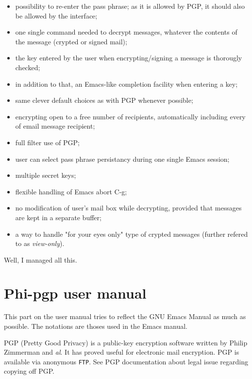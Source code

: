 \begin{itemize}
 \item  possibility to re-enter  the pass phrase;  as it is allowed by
PGP, it should also be allowed by the interface;

 \item one  single command  needed  to decrypt  messages, whatever the
contents of the message (crypted or signed mail);

 \item the key entered by  the user when encrypting/signing a  message
is thorougly checked;

\item in addition  to that, an Emacs-like completion facility when entering a
key;

 \item same clever default choices as with PGP whenever possible;

 \item encrypting  open to a  free number of recipients, automatically
including every of email message recipient;

\item full filter use of PGP;

 \item user can select pass phrase persistancy during one single Emacs
session;

\item multiple secret keys;

\item flexible handling of Emacs abort C-g;

 \item no modification of  user's mail box while decrypting,  provided
that messages are kept in a separate buffer;

 \item a way to  handle "for your eyes only"  type of crypted messages
(further refered to as {\it view-only}).
\end{itemize}

Well, I managed all this.

\section{Phi-pgp user manual}

This part on the user manual tries to reflect  the GNU Emacs Manual as
much as possible. The notations are thoses used in the Emacs manual.

PGP (Pretty Good Privacy) is a  public-key encryption software written
by Philip Zimmerman and {\it al}.  It has proved useful for electronic
mail encryption. PGP   is available via anonymous  {\tt  FTP}. See PGP
documentation about legal issue regarding copying off PGP.

